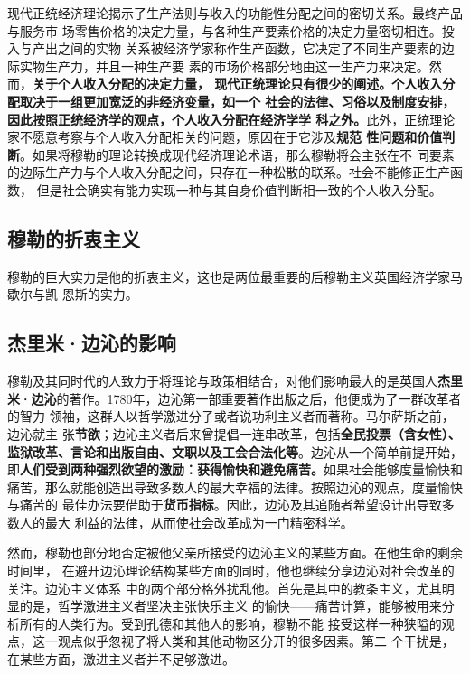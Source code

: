 现代正统经济理论揭示了生产法则与收入的功能性分配之间的密切关系。最终产品与服务市
场零售价格的决定力量，与各种生产要素价格的决定力量密切相连。投入与产出之间的实物
关系被经济学家称作生产函数，它决定了不同生产要素的边际实物生产力，并且一种生产要
素的市场价格部分地由这一生产力来决定。然而，\textbf{关于个人收入分配的决定力量，
  现代正统理论只有很少的阐述。个人收入分配取决于一组更加宽泛的非经济变量，如一个
  社会的法律、习俗以及制度安排，因此按照正统经济学的观点，个人收入分配在经济学学
  科之外。}此外，正统理论家不愿意考察与个人收入分配相关的问题，原因在于它涉及\textbf{规范
性问题和价值判断}。如果将穆勒的理论转换成现代经济理论术语，那么穆勒将会主张在不
同要素的边际生产力与个人收入分配之间，只存在一种松散的联系。社会不能修正生产函数，
但是社会确实有能力实现一种与其自身价值判断相一致的个人收入分配。

\subsection{穆勒的折衷主义}

穆勒的巨大实力是他的折衷主义，这也是两位最重要的后穆勒主义英国经济学家马歇尔与凯
恩斯的实力。

\subsection{杰里米·边沁的影响}

穆勒及其同时代的人致力于将理论与政策相结合，对他们影响最大的是英国人\textbf{杰里
  米·边沁}的著作。1780年，边沁第一部重要著作出版之后，他便成为了一群改革者的智力
领袖，这群人以哲学激进分子或者说功利主义者而著称。马尔萨斯之前，边沁就主
张\textbf{节欲}；边沁主义者后来曾提倡一连串改革，包括\textbf{全民投票（含女性）、
  监狱改革、言论和出版自由、文职以及工会合法化等}。边沁从一个简单前提开始，
即\textbf{人们受到两种强烈欲望的激励：获得愉快和避免痛苦。}如果社会能够度量愉快和
痛苦，那么就能创造出导致多数人的最大幸福的法律。按照边沁的观点，度量愉快与痛苦的
最佳办法要借助于\textbf{货币指标}。因此，边沁及其追随者希望设计出导致多数人的最大
利益的法律，从而使社会改革成为一门精密科学。

然而，穆勒也部分地否定被他父亲所接受的边沁主义的某些方面。在他生命的剩余时间里，
在避开边沁理论结构某些方面的同时，他也继续分享边沁对社会改革的关注。边沁主义体系
中的两个部分格外扰乱他。首先是其中的教条主义，尤其明显的是，哲学激进主义者坚决主张快乐主义
的愉快——痛苦计算，能够被用来分析所有的人类行为。受到孔德和其他人的影响，穆勒不能
接受这样一种狭隘的观点，这一观点似乎忽视了将人类和其他动物区分开的很多因素。第二
个干扰是，在某些方面，激进主义者并不足够激进。

